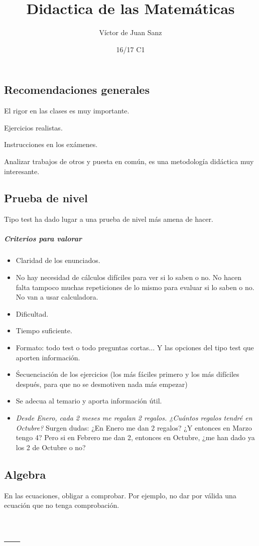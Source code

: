 \documentclass[palatino]{apuntes}
\title{Didactica de las Matemáticas}
\author{Víctor de Juan Sanz}
\date{16/17 C1}
\begin{document}
\pagestyle{plain}
\maketitle

\tableofcontents
\newpage

\section{Recomendaciones generales}

El rigor en las clases es muy importante.

Ejercicios realistas.

Instrucciones en los exámenes.

Analizar trabajos de otros y puesta en común, es una metodología didáctica muy interesante.


\section{Prueba de nivel}

Tipo test ha dado lugar a una prueba de nivel más amena de hacer. 


\paragraph{Criterios para valorar}

\begin{itemize}
	\item Claridad de los enunciados.
	\item No hay necesidad de cálculos difíciles para ver si lo saben o no.
	No hacen falta tampoco muchas repeticiones de lo mismo para evaluar si lo saben o no. 
	No van a usar calculadora.
	\item Dificultad.
	\item Tiempo suficiente.
	\item Formato: todo test o todo preguntas cortas... Y las opciones del tipo test que aporten información.
	\item Śecuenciación de los ejercicios (los más fáciles primero y los más difíciles después, para que no se desmotiven nada más empezar)
	\item Se adecua al temario y aporta información útil.
	\item \textit{Desde Enero, cada 2 meses me regalan 2 regalos. ¿Cuántos regalos tendré en Octubre?} Surgen dudas: ¿En Enero me dan 2 regalos? ¿Y entonces en Marzo tengo 4? Pero si en Febrero me dan 2, entonces en Octubre, ¿me han dado ya los 2 de Octubre o no? 
\end{itemize}

\section{Algebra}

En las ecuaciones, obligar a comprobar. Por ejemplo, no dar por válida una ecuación que no tenga comprobación.

\appendix

\chapter{---}


\printindex
\end{document}
